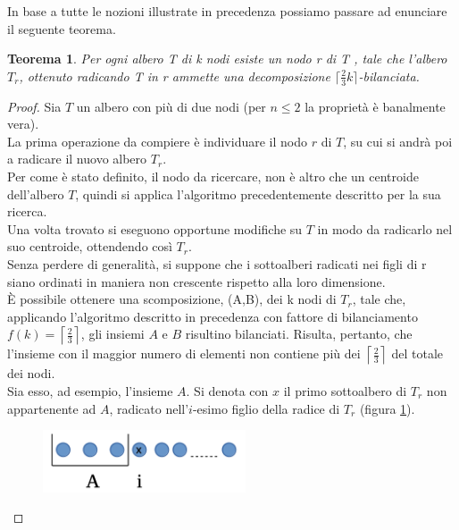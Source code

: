 In base a tutte le nozioni illustrate in precedenza possiamo passare ad enunciare il seguente teorema.


\newtheorem{teorema1}[definizione]{Teorema}
\begin{teorema1}
Per ogni albero T di k nodi esiste un nodo r di T , tale che l'albero $T_r$, ottenuto radicando T in r ammette una decomposizione $ \lceil \frac{2}{3}k \rceil$-bilanciata.
\end{teorema1}
\begin{proof}
	Sia $ T $ un albero con pi\`u di due nodi (per $n\le2$ la propriet\`a \`e banalmente vera). \\
	La prima operazione da compiere \`e individuare il nodo $ r $ di $ T $, su cui si andr\`a poi a radicare il nuovo albero $ T_r $.\\
	Per come \`e stato definito, il nodo da ricercare, non \`e altro che  un centroide dell'albero $ T $, quindi si applica l'algoritmo precedentemente descritto per la sua ricerca.\\ 
	Una volta trovato si eseguono opportune modifiche su $ T $ in modo da radicarlo nel suo centroide, ottendendo cos\`i $ T_r $.\\ 
	Senza perdere di generalit\`a, si suppone che i sottoalberi radicati nei figli di r siano ordinati in maniera non crescente rispetto alla loro dimensione.\\
	\`E possibile ottenere una scomposizione, (A,B), dei k nodi di $T_r$,  tale che, applicando l'algoritmo descritto in precedenza con fattore di bilanciamento $ f(k) = \left\lceil \frac{2}{3} \right\rceil $, gli insiemi $ A $ e $ B $ risultino bilanciati.
	Risulta, pertanto, che l'insieme con il maggior numero di elementi non contiene pi\`u dei $\left\lceil \frac{2}{3} \right\rceil$ del totale dei nodi. \\
	Sia esso, ad esempio, l'insieme $ A $.
	Si denota con $ x $ il primo sottoalbero di $ T_r $ non appartenente ad $  A $, radicato nell'$ i $-esimo figlio della radice di $ T_r $ (figura \ref{fig:4}).
	\begin{figure}[htbp]
		\centering
		\includegraphics[width=6cm]{capitolo3/3}
		\caption{}
		\label{fig:4}
	\end{figure}
	

\end{proof}
